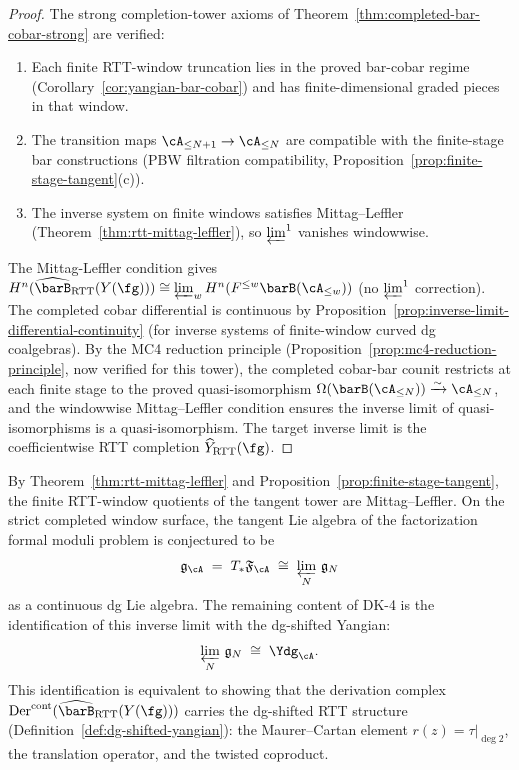 \begin{proof}
The strong completion-tower axioms of
Theorem~\ref{thm:completed-bar-cobar-strong} are verified:
\begin{enumerate}[label=\textup{(\roman*)}]
\item Each finite RTT-window truncation lies in the proved bar-cobar
 regime (Corollary~\ref{cor:yangian-bar-cobar}) and has
 finite-dimensional graded pieces in that window.
\item The transition maps $\cA_{\leq N+1} \to \cA_{\leq N}$ are
 compatible with the finite-stage bar constructions
 (PBW filtration compatibility,
 Proposition~\ref{prop:finite-stage-tangent}(c)).
\item The inverse system on finite windows satisfies
 Mittag--Leffler (Theorem~\ref{thm:rtt-mittag-leffler}), so
 $\varprojlim^1$ vanishes windowwise.
\end{enumerate}
The Mittag-Leffler condition gives
$H^n(\widehat{\barB}_{\mathrm{RTT}}(Y(\fg)))
\cong \varprojlim_w H^n(F^{\leq w}\barB(\cA_{\leq w}))$
(no $\varprojlim^1$ correction). The completed cobar differential
is continuous by
Proposition~\ref{prop:inverse-limit-differential-continuity}
(for inverse systems of finite-window curved dg coalgebras). By the
MC4 reduction principle
(Proposition~\ref{prop:mc4-reduction-principle},
now verified for this tower), the completed cobar-bar counit
restricts at each finite stage to the proved
quasi-isomorphism
$\Omega(\barB(\cA_{\leq N})) \xrightarrow{\sim} \cA_{\leq N}$,
and the windowwise Mittag--Leffler condition ensures the inverse
limit of quasi-isomorphisms is a quasi-isomorphism. The target inverse
limit is the coefficientwise RTT completion
$\widehat Y_{\mathrm{RTT}}(\fg)$.
\end{proof}

\begin{conjecture}
\label{conj:dk4-inverse-limit}
By Theorem~\textup{\ref{thm:rtt-mittag-leffler}} and
Proposition~\textup{\ref{prop:finite-stage-tangent}}, the finite
RTT-window quotients of the tangent tower are Mittag--Leffler. On the
strict completed window surface, the tangent Lie algebra of the
factorization formal moduli problem is conjectured to be
\[
\mathfrak{g}_{\cA}
\;=\;
T_{*}\mathfrak{F}_{\cA}
\;\cong\;
\varprojlim_N\, \mathfrak{g}_N
\]
as a continuous dg Lie algebra.
The remaining content of DK-4 is the identification of this
inverse limit with the dg-shifted Yangian:
\[
\varprojlim_N\, \mathfrak{g}_N
\;\cong\;
\Ydg_{\cA}.
\]
This identification is equivalent to showing that the derivation
complex
$\operatorname{Der}^{\mathrm{cont}}
(\widehat{\barB}_{\mathrm{RTT}}(Y(\fg)))$
carries the dg-shifted RTT structure
\textup{(}Definition~\textup{\ref{def:dg-shifted-yangian}}\textup{)}:
the Maurer--Cartan element $r(z) = \tau|_{\deg 2}$, the
translation operator, and the twisted coproduct.
\end{conjecture}

